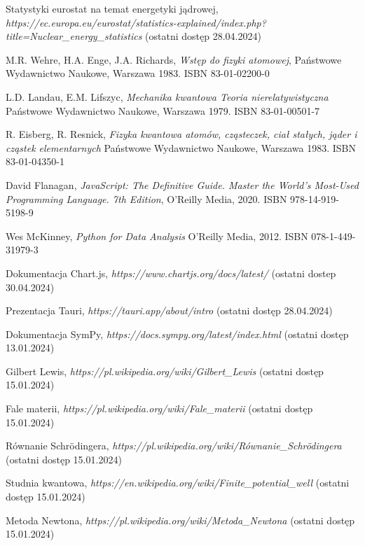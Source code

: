 \documentclass{SGGW-thesis}
\begin{document}
\begin{thebibliography}{9}
	Statystyki eurostat na temat energetyki jądrowej, 
	\textit{https://ec.europa.eu/eurostat/statistics-explained/index.php?title=Nuclear\_energy\_statistics}
	(ostatni dostęp 28.04.2024)

	M.R. Wehre, H.A. Enge, J.A. Richards,
	\textit{Wstęp do fizyki atomowej}, 
	Państwowe Wydawnictwo Naukowe, Warszawa 1983. ISBN 83-01-02200-0
	
	L.D. Landau, E.M. Lifszyc,
	\textit{Mechanika kwantowa Teoria nierelatywistyczna}
	Państwowe Wydawnictwo Naukowe, Warszawa 1979. ISBN 83-01-00501-7
	
	R. Eisberg, R. Resnick,
	\textit{Fizyka kwantowa atomów, cząsteczek, ciał stałych, jąder i cząstek elementarnych}
	Państwowe Wydawnictwo Naukowe, Warszawa 1983. ISBN 83-01-04350-1

	David Flanagan, 
	\textit{JavaScript: The Definitive Guide. Master the World's Most-Used Programming Language. 7th Edition}, 
	O'Reilly Media, 2020. ISBN 978-14-919-5198-9
	
	Wes McKinney, 
	\textit{Python for Data Analysis}
	O'Reilly Media, 2012. ISBN 078-1-449-31979-3
	
	Dokumentacja Chart.js, 
	\textit{https://www.chartjs.org/docs/latest/}
	(ostatni dostep 30.04.2024)
	
	Prezentacja Tauri, 
	\textit{https://tauri.app/about/intro}
	(ostatni dostęp 28.04.2024)
	
	Dokumentacja SymPy, 
	\textit{https://docs.sympy.org/latest/index.html}
	(ostatni dostęp 13.01.2024)
	
	Gilbert Lewis, 
	\textit{https://pl.wikipedia.org/wiki/Gilbert\_Lewis}
	(ostatni dostęp 15.01.2024)
	
	Fale materii, 
	\textit{https://pl.wikipedia.org/wiki/Fale\_materii}
	(ostatni dostęp 15.01.2024)
	
	Równanie Schrödingera, 
	\textit{https://pl.wikipedia.org/wiki/Równanie\_Schrödingera}
	(ostatni dostęp 15.01.2024)
	
	Studnia kwantowa, 
	\textit{https://en.wikipedia.org/wiki/Finite\_potential\_well}
	(ostatni dostęp 15.01.2024)
	
	Metoda Newtona, 
	\textit{https://pl.wikipedia.org/wiki/Metoda\_Newtona}
	(ostatni dostęp 15.01.2024) 
	

\end{thebibliography}
\end{document}
